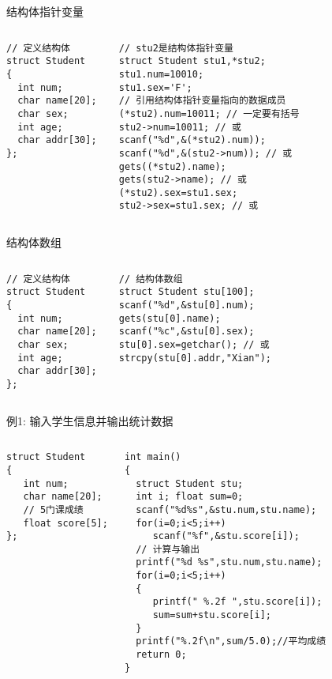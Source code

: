 \begin{frame}{结构体指针变量}
\begin{columns}[T]
\begin{lstlisting}
// 定义结构体
struct Student 
{ 
  int num;
  char name[20];
  char sex;
  int age;
  char addr[30]; 
};
\end{lstlisting}
\begin{lstlisting}
// stu2是结构体指针变量
struct Student stu1,*stu2;
stu1.num=10010;
stu1.sex='F';
// 引用结构体指针变量指向的数据成员
(*stu2).num=10011; // 一定要有括号
stu2->num=10011; // 或
scanf("%d",&(*stu2).num));
scanf("%d",&(stu2->num)); // 或
gets((*stu2).name); 
gets(stu2->name); // 或
(*stu2).sex=stu1.sex; 
stu2->sex=stu1.sex; // 或
\end{lstlisting}
\end{columns}
\medskip
\end{frame}

\begin{frame}{结构体数组}
\begin{columns}[T]
\begin{lstlisting}
// 定义结构体
struct Student 
{ 
  int num;
  char name[20];
  char sex;
  int age;
  char addr[30]; 
};
\end{lstlisting}
\begin{lstlisting}
// 结构体数组
struct Student stu[100];
scanf("%d",&stu[0].num);
gets(stu[0].name);
scanf("%c",&stu[0].sex);
stu[0].sex=getchar(); // 或
strcpy(stu[0].addr,"Xian");
\end{lstlisting}
\end{columns}
\medskip
\end{frame}

\begin{frame}{例1: 输入学生信息并输出统计数据}
\begin{columns}[T]
\begin{lstlisting}
struct Student 
{ 
   int num;
   char name[20];
   // 5门课成绩
   float score[5];
};

\end{lstlisting}
\begin{lstlisting}
int main()
{ 
  struct Student stu;
  int i; float sum=0;
  scanf("%d%s",&stu.num,stu.name);
  for(i=0;i<5;i++) 
     scanf("%f",&stu.score[i]); 
  // 计算与输出
  printf("%d %s",stu.num,stu.name);
  for(i=0;i<5;i++)
  { 
     printf(" %.2f ",stu.score[i]);
     sum=sum+stu.score[i];
  }
  printf("%.2f\n",sum/5.0);//平均成绩 
  return 0;
}
\end{lstlisting}
\end{columns}
\medskip
\end{frame}

